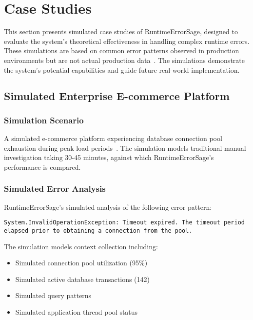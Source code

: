 \section{Case Studies}\label{sec:case-studies}

This section presents simulated case studies of RuntimeErrorSage, designed to evaluate the system's theoretical effectiveness in handling complex runtime errors. These simulations are based on common error patterns observed in production environments but are not actual production data~\cite{production_error_analysis_2023, runtime_remediation_2024}. The simulations demonstrate the system's potential capabilities and guide future real-world implementation.

\subsection{Simulated Enterprise E-commerce Platform}

\subsubsection{Simulation Scenario}
A simulated e-commerce platform experiencing database connection pool exhaustion during peak load periods~\cite{database_performance_2023}. The simulation models traditional manual investigation taking 30-45 minutes, against which RuntimeErrorSage's performance is compared.

\subsubsection{Simulated Error Analysis}
RuntimeErrorSage's simulated analysis of the following error pattern:
\begin{lstlisting}[style=csharpstyle,caption={Simulated Database Connection Pool Error}]
System.InvalidOperationException: Timeout expired. The timeout period elapsed prior to obtaining a connection from the pool.
\end{lstlisting}

The simulation models context collection including:
\begin{itemize}
    \item Simulated connection pool utilization (95\%)
    \item Simulated active database transactions (142)
    \item Simulated query patterns
    \item Simulated application thread pool status
\end{itemize}

